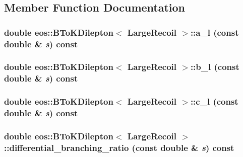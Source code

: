 \subsection{Member Function Documentation}
\hypertarget{classeos_1_1BToKDilepton_3_01LargeRecoil_01_4_a2023c59cc447f5512b4d26b2859ec49a}{
\subsubsection[{a\_\-l}]{\setlength{\rightskip}{0pt plus 5cm}double eos::BToKDilepton$<$ {\bf LargeRecoil} $>$::a\_\-l (const double \& {\em s}) const}}
\label{classeos_1_1BToKDilepton_3_01LargeRecoil_01_4_a2023c59cc447f5512b4d26b2859ec49a}
\hypertarget{classeos_1_1BToKDilepton_3_01LargeRecoil_01_4_a1a5b5dfaf3a249e4992af2d868d8b543}{
\subsubsection[{b\_\-l}]{\setlength{\rightskip}{0pt plus 5cm}double eos::BToKDilepton$<$ {\bf LargeRecoil} $>$::b\_\-l (const double \& {\em s}) const}}
\label{classeos_1_1BToKDilepton_3_01LargeRecoil_01_4_a1a5b5dfaf3a249e4992af2d868d8b543}
\hypertarget{classeos_1_1BToKDilepton_3_01LargeRecoil_01_4_a7c773c2a61d0a009a5c3d5c10aa6c9c4}{
\subsubsection[{c\_\-l}]{\setlength{\rightskip}{0pt plus 5cm}double eos::BToKDilepton$<$ {\bf LargeRecoil} $>$::c\_\-l (const double \& {\em s}) const}}
\label{classeos_1_1BToKDilepton_3_01LargeRecoil_01_4_a7c773c2a61d0a009a5c3d5c10aa6c9c4}
\hypertarget{classeos_1_1BToKDilepton_3_01LargeRecoil_01_4_a858a2f5d3589827abb3f221125ccc151}{
\subsubsection[{differential\_\-branching\_\-ratio}]{\setlength{\rightskip}{0pt plus 5cm}double eos::BToKDilepton$<$ {\bf LargeRecoil} $>$::differential\_\-branching\_\-ratio (const double \& {\em s}) const}}
